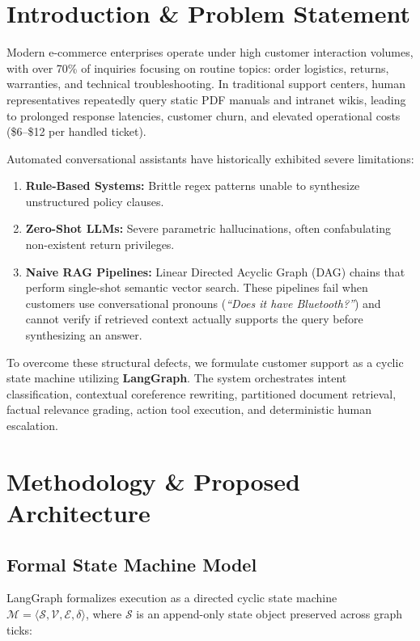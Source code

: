 \documentclass[11pt,a4paper]{article}
\begin{document}
\section{Introduction \& Problem Statement}
Modern e-commerce enterprises operate under high customer interaction volumes, with over 70\% of inquiries focusing on routine topics: order logistics, returns, warranties, and technical troubleshooting. In traditional support centers, human representatives repeatedly query static PDF manuals and intranet wikis, leading to prolonged response latencies, customer churn, and elevated operational costs (\$6--\$12 per handled ticket).

Automated conversational assistants have historically exhibited severe limitations:
\begin{enumerate}
    \item \textbf{Rule-Based Systems:} Brittle regex patterns unable to synthesize unstructured policy clauses.
    \item \textbf{Zero-Shot LLMs:} Severe parametric hallucinations, often confabulating non-existent return privileges.
    \item \textbf{Naive RAG Pipelines:} Linear Directed Acyclic Graph (DAG) chains that perform single-shot semantic vector search. These pipelines fail when customers use conversational pronouns (\textit{``Does it have Bluetooth?''}) and cannot verify if retrieved context actually supports the query before synthesizing an answer.
\end{enumerate}

To overcome these structural defects, we formulate customer support as a cyclic state machine utilizing \textbf{LangGraph}. The system orchestrates intent classification, contextual coreference rewriting, partitioned document retrieval, factual relevance grading, action tool execution, and deterministic human escalation.

\section{Methodology \& Proposed Architecture}

\subsection{Formal State Machine Model}
LangGraph formalizes execution as a directed cyclic state machine $\mathcal{M} = \langle \mathcal{S}, \mathcal{V}, \mathcal{E}, \delta \rangle$, where $\mathcal{S}$ is an append-only state object preserved across graph ticks:
\end{document}
